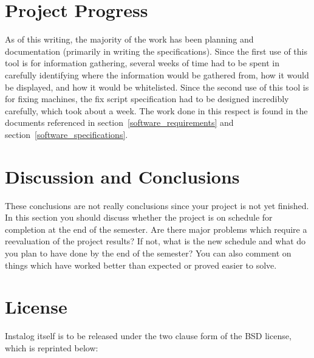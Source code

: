 \documentclass[letterpaper,12pt]{article}
\begin{document}
\newpage



\section{Project Progress} \label{project_progress}
As of this writing, the majority of the work has been planning and documentation
(primarily in writing the specifications).  Since the first use of this tool is
for information gathering, several weeks of time had to be spent in carefully
identifying where the information would be gathered from, how it would be
displayed, and how it would be whitelisted.  Since the second use of this tool
is for fixing machines, the fix script specification had to be designed
incredibly carefully, which took about a week.  The work done in this respect is
found in the documents referenced in section~\ref{software_requirements} and
section~\ref{software_specifications}.  

\newpage



\section{Discussion and Conclusions} \label{discussion}
These conclusions are not really conclusions since your project is not yet
finished. In this section you should discuss whether the project is on schedule
for completion at the end of the semester. Are there major problems which
require a reevaluation of the project results?  If not, what is the new schedule
and what do you plan to have done by the end of the semester?  You can also
comment on things which have worked better than expected or proved easier to
solve.

\newpage



\section{License} \label{license}
Instalog itself is to be released under the two clause form of the BSD license,
which is reprinted below:
\end{document}
